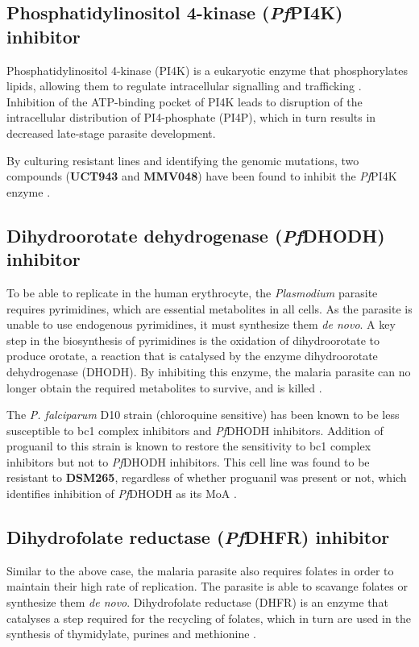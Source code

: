 \documentclass[twocolumn]{bmcart}%
\begin{document}
\subsection*{Phosphatidylinositol 4-kinase (\textit{Pf}PI4K) inhibitor}
Phosphatidylinositol 4-kinase (PI4K) is a eukaryotic enzyme that phosphorylates lipids, allowing them to regulate intracellular signalling and trafficking \cite{McNamara2013}. Inhibition of the ATP-binding pocket of PI4K leads to disruption of the intracellular distribution of PI4-phosphate (PI4P), which in turn results in decreased late-stage parasite development.

By culturing resistant lines and identifying the genomic mutations, two compounds (\textbf{UCT943} and \textbf{MMV048}) have been found to inhibit the \textit{Pf}PI4K enzyme \cite{McNamara2013}.

\subsection*{Dihydroorotate dehydrogenase (\textit{Pf}DHODH) inhibitor}
To be able to replicate in the human erythrocyte, the \textit{Plasmodium} parasite requires pyrimidines, which are essential metabolites in all cells. As the parasite is unable to use endogenous pyrimidines, it must synthesize them \textit{de novo}. A key step in the biosynthesis of pyrimidines is the oxidation of dihydroorotate to produce orotate, a reaction that is catalysed by the enzyme dihydroorotate dehydrogenase (DHODH). By inhibiting this enzyme, the malaria parasite can no longer obtain the required metabolites to survive, and is killed \cite{Baldwin2002}.

The \textit{P. falciparum} D10 strain (chloroquine sensitive) has been known to be less susceptible to bc1 complex inhibitors and \textit{Pf}DHODH inhibitors. Addition of proguanil to this strain is known to restore the sensitivity to bc1 complex inhibitors but not to \textit{Pf}DHODH inhibitors. This cell line was found to be resistant to \textbf{DSM265}, regardless of whether proguanil was present or not, which identifies inhibition of \textit{Pf}DHODH as its MoA \cite{Coteron2011,Phillips2015}.

\subsection*{Dihydrofolate reductase (\textit{Pf}DHFR) inhibitor}
Similar to the above case, the malaria parasite also requires folates in order to maintain their high rate of replication. The parasite is able to scavange folates or synthesize them \textit{de novo}. Dihydrofolate reductase (DHFR) is an enzyme that catalyses a step required for the recycling of folates, which in turn are used in the synthesis of thymidylate, purines and methionine \cite{Yuthavong2005}.
\end{document}
